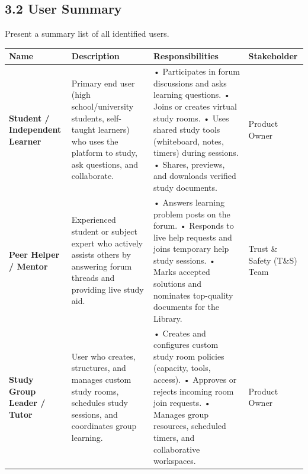 \documentclass[12pt]{article}
\renewcommand{\baselinestretch}{1.5}
\begin{document}
\subsection*{3.2 User Summary}
\par\medskip
Present a summary list of all identified users.
\par\medskip
\begingroup
\scriptsize
\renewcommand{\baselinestretch}{1.0}\selectfont
\renewcommand{\arraystretch}{1.15}
\setlength{\tabcolsep}{4pt}
\begin{longtable}{|>{\raggedright\arraybackslash}p{}|>{\raggedright\arraybackslash}p{}|>{\raggedright\arraybackslash}p{}|>{\raggedright\arraybackslash}p{}|}
\hline
Name & Description & Responsibilities & Stakeholder \\ \hline
\endhead
\textbf{Student /\allowbreak{} Independent Learner} & Primary end user (high school/\allowbreak{}university students, self-taught learners) who uses the platform to study, ask questions, and collaborate. & • Participates in forum discussions and asks learning questions. \newline{}  • Joins or creates virtual study rooms. \newline{} • Uses shared study tools (whiteboard, notes, timers) during sessions. \newline{} • Shares, previews, and downloads verified study documents. & Product Owner \\ \hline
\textbf{Peer Helper /\allowbreak{} Mentor} & Experienced student or subject expert who actively assists others by answering forum threads and providing live study aid. & • Answers learning problem posts on the forum. \newline{} • Responds to live help requests and joins temporary help study sessions. \newline{} • Marks accepted solutions and nominates top-quality documents for the Library. & Trust \& Safety (T\&S) Team \\ \hline
\textbf{Study Group Leader /\allowbreak{} Tutor} & User who creates, structures, and manages custom study rooms, schedules study sessions, and coordinates group learning. & • Creates and configures custom study room policies (capacity, tools, access). \newline{} • Approves or rejects incoming room join requests. \newline{} • Manages group resources, scheduled timers, and collaborative workspaces. & Product Owner \\ \hline
\end{longtable}
\endgroup
\par\medskip
\hypertarget{sec:33-user-environment}{}
\end{document}
